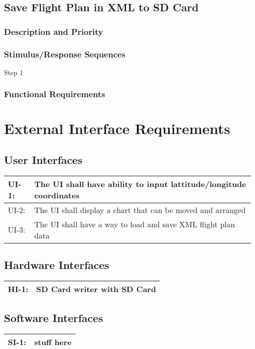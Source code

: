 \documentclass[12pt, letterpaper]{article}
\begin{document}
        \subsection{Save Flight Plan in XML to SD Card}
          \subsubsection{Description and Priority}
          \subsubsection{Stimulus/Response Sequences}
            \begin{description}
              \item[Step 1]
            \end{description}
          \subsubsection{Functional Requirements}

\section{External Interface Requirements}
  \subsection{User Interfaces}
    \begin{tabularx}{\textwidth}{|l|X|}
      \hline
      UI-1: & The UI shall have ability to input lattitude/longitude coordinates\\ \hline
      UI-2: & The UI shall display a chart that can be moved and arranged\\ \hline
      UI-3: & The UI shall have a way to load and save XML flight plan data\\ \hline
    \end{tabularx}
  \subsection{Hardware Interfaces}
    \begin{tabularx}{\textwidth}{|l|X|}
      \hline
      HI-1: & SD Card writer with SD Card\\
      \hline
    \end{tabularx}

  \subsection{Software Interfaces}
    \begin{tabularx}{\textwidth}{|l|X|}
      \hline
      SI-1: & stuff here \\
      \hline
    \end{tabularx}
\end{document}
